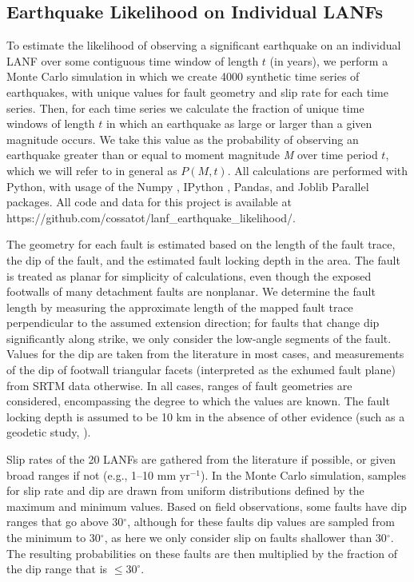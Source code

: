 \documentclass[twocolumn,grl]{AGUTeX}
\begin{document}
\begin{article}
\subsection{Earthquake Likelihood on Individual LANFs}
To estimate the likelihood of observing a significant earthquake on an
individual LANF over some contiguous time window of length $t$ (in years), we
perform a Monte Carlo simulation in which we create 4000 synthetic time series
of earthquakes, with unique values for fault geometry and slip rate for each
time series. Then, for each time series we calculate the fraction of unique
time windows of length $t$ in which an earthquake as large or larger than
a given magnitude occurs.  We take this value as the probability of observing
an earthquake greater than or equal to moment magnitude \emph{M} over time
period $t$, which we will refer to in general as $P(M,t)$.  All calculations
are performed with Python, with usage of the Numpy \citep{oliphant2007numpy},
IPython \citep{perez2007ipython}, Pandas, and Joblib Parallel
\citep{varoquaux_joblib} packages.  All code and data for this project is
available at https://github.com/cossatot/lanf\_earthquake\_likelihood/.

The geometry for each fault is estimated based on the length of the fault
trace, the dip of the fault, and the estimated fault locking depth in the area.
The fault is treated as planar for simplicity of calculations, even though the
exposed footwalls of many detachment faults are nonplanar.  We determine the
fault length by measuring the approximate length of the mapped fault trace
perpendicular to the assumed extension direction; for faults that change dip
significantly along strike, we only consider the low-angle segments of the
fault.  Values for the dip are taken from the literature in most cases, and
measurements of the dip of footwall triangular facets (interpreted as the
exhumed fault plane) from SRTM data otherwise. In all cases, ranges of fault
geometries are considered, encompassing the degree to which the values are
known. The fault locking depth is assumed to be 10 km in the absence of other
evidence (such as a geodetic study, \citep[e.g.,][]{hreinsdottir2009altotib}).

Slip rates of the 20 LANFs are gathered from the literature if possible, or
given broad ranges if not (e.g., 1--10 mm yr$^{-1}$).  In the Monte Carlo
simulation, samples for slip rate and dip are drawn from uniform distributions
defined by the maximum and minimum values.  Based on field observations, some
faults have dip ranges that go above 30$^\circ$, although for these faults dip
values are sampled from the minimum to 30$^\circ$, as here we only consider
slip on faults shallower than 30$^\circ$. The resulting probabilities on these
faults are then multiplied by the fraction of the dip range that is
$\le30^\circ$.


\end{article}
\end{document}
